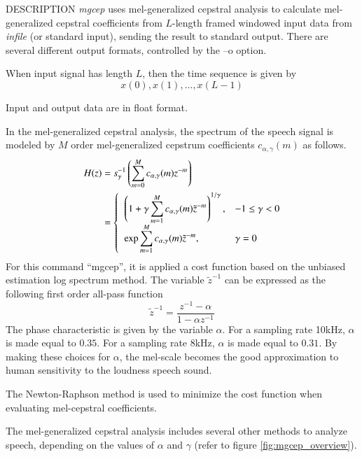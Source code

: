 \begin{qsection}{DESCRIPTION}
{\em mgcep} uses mel-generalized cepstral analysis 
to calculate mel-generalized cepstral coefficients 
from $L$-length framed windowed input data 
from {\em infile} (or standard input), 
sending the result to standard output. 
There are several different output formats,
controlled by the --o option.

When input signal has length $L$,
then the time sequence is given by
\begin{displaymath}
  x(0),x(1),\dots,x(L-1)
\end{displaymath}

Input and output data are in float format.

In the mel-generalized cepstral analysis, the spectrum of the speech signal
is modeled by $M$ order mel-generalized cepstrum
coefficients $c_{\alpha, \gamma}(m)$
as follows.
\begin{align}
H(z) &= s_\gamma^{-1}\left(
	\sum_{m=0}^M c_{\alpha, \gamma}(m)z^{-m} \right) \notag \\
     &= \begin{cases} \;\; \displaystyle
	\left( 1+\gamma\sum_{m=1}^M c_{\alpha, \gamma}(m)\tilde{z}^{-m}
		\right)^{1/\gamma}, & -1 \leq \gamma < 0 \\
	\;\; \displaystyle \exp \sum_{m=1}^M c_{\alpha, \gamma}(m)\tilde{z}^{-m}, 
		& \gamma=0
	\end{cases} \notag
\end{align}
For this command ``mgcep'', it is applied a cost function
based on the unbiased estimation log spectrum method.
The variable $\tilde{z}^{-1}$ can be expressed as the following
first order all-pass function
\begin{displaymath}
\tilde{z}^{-1} = \frac{z^{-1}-\alpha}{1-\alpha z^{-1}}
\end{displaymath}
The phase characteristic is given by the variable $\alpha$.
For a sampling rate 10kHz, $\alpha$ is made equal to $0.35$.
For a sampling rate 8kHz, $\alpha$ is made equal to $0.31$.
By making these choices for $\alpha$,
the mel-scale becomes the good approximation to human
sensitivity to the loudness speech sound.

The Newton-Raphson method is used to minimize the cost function
when evaluating mel-cepstral coefficients.

The mel-generalized cepstral analysis includes several other
methods to analyze speech, depending on the values of $\alpha$
and $\gamma$ (refer to figure \ref{fig:mgcep_overview}).


\end{qsection}
